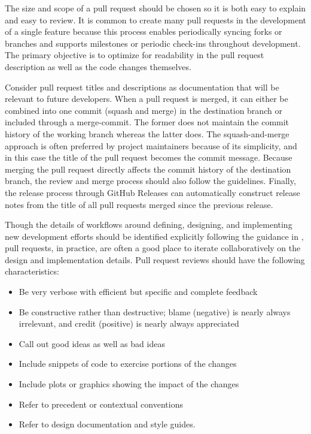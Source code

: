 \documentclass[]{nlr}
\begin{document}
The size and scope of a pull request should be chosen so it is both easy to explain and
easy to review.
It is common to create many pull requests in the development of a single
feature because this process enables periodically syncing forks or branches and supports
milestones or periodic check-ins throughout development.
The primary objective is to optimize for readability in the pull request description as well as
the code changes themselves.

Consider pull request titles and descriptions as documentation that will be relevant to
future developers.
When a pull request is merged, it can either be combined into one commit (squash and merge)
in the destination branch or included through a merge-commit.
The former does not maintain the commit history of the working branch whereas the latter does.
The squash-and-merge approach is often preferred by project maintainers because of its simplicity,
and in this case the title of the pull request becomes the commit message.
Because merging the pull request directly affects the commit history of the destination branch,
the review and merge process should also follow the  guidelines.
Finally, the release process through GitHub Releases can automatically construct
release notes from the title of all pull requests merged since the previous release.

Though the details of workflows around defining, designing, and implementing new development
efforts should be identified explicitly following the guidance in , pull requests,
in practice, are often a good place to iterate collaboratively on the design and implementation
details.
Pull request reviews should have the following characteristics:

\begin{itemize}
\item Be very verbose with efficient but specific and complete feedback
\item Be constructive rather than destructive; blame (negative) is nearly always irrelevant,
    and credit (positive) is nearly always appreciated
\item Call out good ideas as well as bad ideas
\item Include snippets of code to exercise portions of the changes
\item Include plots or graphics showing the impact of the changes
\item Refer to precedent or contextual conventions
\item Refer to design documentation and style guides.
\end{itemize}
\end{document}
